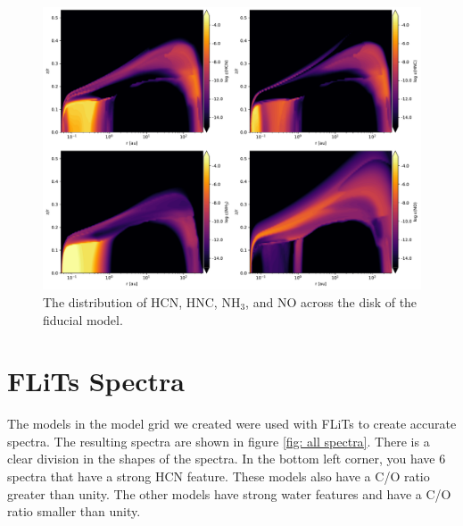 \documentclass[oneside, single, authoryear, semicolon]{lion-msc}
\newcommand{\4}{$_4$}
\newcommand{\3}{$_3$}
\newcommand{\2}{$_2$}
\begin{document}
\begin{figure}[!ht]
    \centering
    \includegraphics[width=\linewidth]{Figures/Abundance2.pdf}
    \caption{The distribution of HCN, HNC, NH\3, and NO across the disk of the fiducial model.}
    \label{fig: nitrogen distribution}
\end{figure}

\section{FLiTs Spectra}
The models in the model grid we created were used with FLiTs to create accurate spectra. The resulting spectra are shown in figure \ref{fig: all spectra}. There is a clear division in the shapes of the spectra. In the bottom left corner, you have 6 spectra that have a strong HCN feature. These models also have a C/O ratio greater than unity. The other models have strong water features and have a C/O ratio smaller than unity. 
\end{document}
